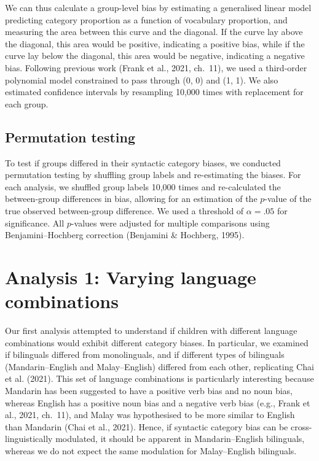 \documentclass[10pt, letterpaper]{article}
\begin{document}
We can thus calculate a group-level bias by estimating a generalised
linear model predicting category proportion as a function of vocabulary
proportion, and measuring the area between this curve and the diagonal.
If the curve lay above the diagonal, this area would be positive,
indicating a positive bias, while if the curve lay below the diagonal,
this area would be negative, indicating a negative bias. Following
previous work (Frank et al., 2021, ch.~11), we used a third-order
polynomial model constrained to pass through (0, 0) and (1, 1). We also
estimated confidence intervals by resampling 10,000 times with
replacement for each group.

\subsection{Permutation testing}\label{permutation-testing}

To test if groups differed in their syntactic category biases, we
conducted permutation testing by shuffling group labels and
re-estimating the biases. For each analysis, we shuffled group labels
10,000 times and re-calculated the between-group differences in bias,
allowing for an estimation of the \(p\)-value of the true observed
between-group difference. We used a threshold of \(\alpha = .05\) for
significance. All \(p\)-values were adjusted for multiple comparisons
using Benjamini--Hochberg correction (Benjamini \& Hochberg, 1995).

\section{Analysis 1: Varying language
combinations}\label{analysis-1-varying-language-combinations}

Our first analysis attempted to understand if children with different
language combinations would exhibit different category biases. In
particular, we examined if bilinguals differed from monolinguals, and if
different types of bilinguals (Mandarin--English and Malay--English)
differed from each other, replicating Chai et al. (2021). This set of
language combinations is particularly interesting because Mandarin has
been suggested to have a positive verb bias and no noun bias, whereas
English has a positive noun bias and a negative verb bias (e.g., Frank
et al., 2021, ch.~11), and Malay was hypothesised to be more similar to
English than Mandarin (Chai et al., 2021). Hence, if syntactic category
bias can be cross-linguistically modulated, it should be apparent in
Mandarin--English bilinguals, whereas we do not expect the same
modulation for Malay--English bilinguals.
\end{document}
